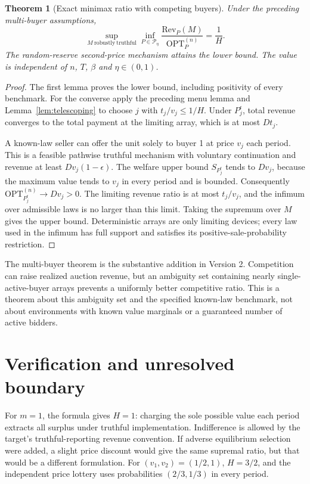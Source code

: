 \documentclass[11pt]{article}
\newtheorem{theorem}{Theorem}
\theoremstyle{remark}\newtheorem{remark}[theorem]{Remark}
\begin{document}
\begin{theorem}[Exact minimax ratio with competing buyers]
Under the preceding multi-buyer assumptions,
\[
 \sup_{M\ \mathrm{robustly\ truthful}}
 \inf_{P\in\mathcal P_\eta}
 \frac{\mathrm{Rev}_P(M)}{\mathrm{OPT}^{(n)}_P}
 =\frac1H.
\]
The random-reserve second-price mechanism attains the lower bound.
The value is independent of $n$, $T$, $\beta$ and $\eta\in(0,1)$.
\end{theorem}
\begin{proof}
The first lemma proves the lower bound, including positivity of every
benchmark. For the converse apply the preceding menu lemma and
Lemma~\ref{lem:telescoping} to choose $j$ with $t_j/v_j\leq1/H$.
Under $P_j^\epsilon$, total revenue converges to the total payment at
the limiting array, which is at most $Dt_j$.

A known-law seller can offer the unit solely to buyer 1 at price $v_j$
each period. This is a feasible pathwise truthful mechanism with
voluntary continuation and revenue at least $Dv_j(1-\epsilon)$.
The welfare upper bound $S_{P_j^\epsilon}$ tends to $Dv_j$, because
the maximum value tends to $v_j$ in every period and is bounded.
Consequently $\mathrm{OPT}^{(n)}_{P_j^\epsilon}\to Dv_j>0$.
The limiting revenue ratio is at most $t_j/v_j$, and the infimum over
admissible laws is no larger than this limit. Taking the supremum over
$M$ gives the upper bound. Deterministic arrays are only limiting devices;
every law used in the infimum has full support and satisfies its
positive-sale-probability restriction.
\end{proof}

The multi-buyer theorem is the substantive addition in Version 2.
Competition can raise realized auction revenue, but an ambiguity set
containing nearly single-active-buyer arrays prevents a uniformly better
competitive ratio. This is a theorem about this ambiguity set and the
specified known-law benchmark, not about environments with known value
marginals or a guaranteed number of active bidders.

\section*{Verification and unresolved boundary}
For $m=1$, the formula gives $H=1$: charging the sole possible value each period extracts all surplus under truthful implementation. Indifference is allowed by the target's truthful-reporting revenue convention. If adverse equilibrium selection were added, a slight price discount would give the same supremal ratio, but that would be a different formulation. For $(v_1,v_2)=(1/2,1)$, $H=3/2$, and the independent price lottery uses probabilities $(2/3,1/3)$ in every period.
\end{document}
